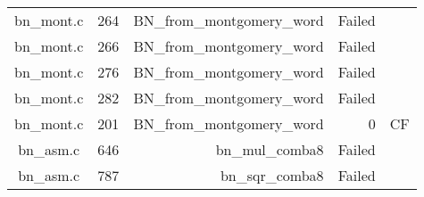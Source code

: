 \begin{table}[h]
{\begin{tabular}{clrrr}
bn\_mont.c&264&BN\_from\_montgomery\_word&Failed&\\
bn\_mont.c&266&BN\_from\_montgomery\_word&Failed&\\
bn\_mont.c&276&BN\_from\_montgomery\_word&Failed&\\
bn\_mont.c&282&BN\_from\_montgomery\_word&Failed&\\
bn\_mont.c&201&BN\_from\_montgomery\_word&0 &CF\\
bn\_asm.c&646&bn\_mul\_comba8&Failed&\\
bn\_asm.c&787&bn\_sqr\_comba8&Failed&\\
\hline
\end{tabular}
}
\end{table}
